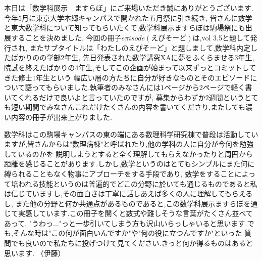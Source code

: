 本日は「数学科展示　ますらぼ」にご来場いただき誠にありがとうございます.今年5月に東京大学本郷キャンパスで開かれた五月祭に引き続き,
皆さんに数学と東大数学科について知ってもらいたくて,数学科展示ますらぼは駒場祭にも出展することを決めました.
今回の冊子$e\pi isode$$(えぴそーど)$は,vol 3.5と題して発行され, またサブタイトルは「わたしのえぴそーど」と題しまして,数学科内定したばかりのの学部$2$年生,
先日発表された数学講究XAに夢をふくらませる$3$年生,院試を終えたばかりの$4$年生,そしてこの企画が始まって以来ずっとコミットしてきた修士$1$年生という
幅広い層の方たちに自分が好きなものとそのエピソードについて語ってもらいました.執筆者のみなさんには$1$ページから$2$ページで軽く書いてくれるだけで良いよと言っていたのですが,
募集からわずか$2$週間というとても短い期間でみなさんこれだけたくさんの内容を書いてくださり,またしても濃い内容の冊子が出来上がりました.\par
数学科はこの駒場キャンパスの東の端にある数理科学研究棟で普段は活動していますが,皆さんからは"数理病棟"と呼ばれたり,他の学科の人に自分が今何を勉強しているのかを
説明しようとすると全く理解してもらえなかったりと周囲から距離を感じることがあります.しかし,数学というのはとてもシンプルにまた何に縛られることもなく物事にアプローチをする手段であり,
数学をすることによって培われる技能というのは普遍的でどこの分野に於いても通じるものであると私は信じていますし,その面白さは丁寧に話しあえば多くの人に理解してもらえるし,
また他の分野と何か共通点があるものであると,この数学科展示ますらぼを通じて実感しています.この冊子を開くと数式や難しそうな言葉がたくさん並べてあって,
"うわっ..."っと一歩引いてしまう方も沢山いらっしゃいると思います.でも,そんな時は"この何が面白いんですか"や"何の役に立つんですか"といった
質問でも良いので私たちに投げつけて見てください.きっと何か得るものはあると思います.
（伊藤）
